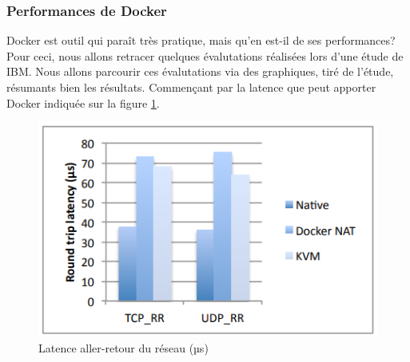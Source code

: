 \documentclass[
    iai, %
    il, %
]{heig-tb}
\begin{document}



\subsubsection{Performances de Docker}
Docker est outil qui paraît très pratique, mais qu'en est-il de ses performances?
Pour ceci, nous allons retracer quelques évalutations réalisées lors d'une étude de IBM. Nous allons parcourir ces évalutations via des graphiques, tiré de l'étude, résumants bien les résultats.
Commençant par la latence que peut apporter Docker indiquée sur la figure \ref{network-latency}.

\begin{center}
    \begin{figure}
        \includegraphics[width=\textwidth]{./assets/figures/docker-perf-latency.png}
        \caption[Docker latence aller-retour du réseau]{Latence aller-retour du réseau (µs) \cite{rad2017introduction} \label{network-latency}}
    \end{figure}
\end{center}
\end{document}
